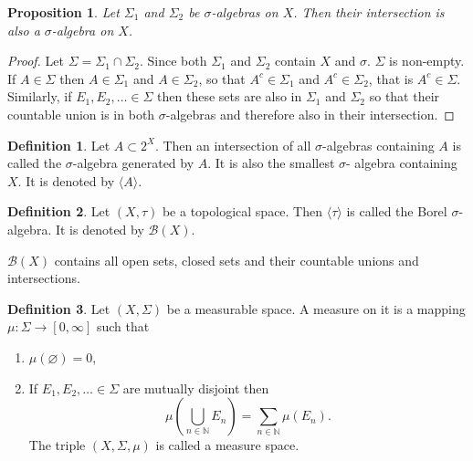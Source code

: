 \documentclass{article}
\theoremstyle{plain}
\numberwithin{thm}{section}
\theoremstyle{plain}
\newtheorem{prop}{Proposition}
\numberwithin{prop}{section}
\theoremstyle{definition}
\newtheorem{defn}{Definition}
\numberwithin{defn}{section}
\theoremstyle{remark}
\theoremstyle{plain}
\numberwithin{cor}{section}
\numberwithin{equation}{section}
\begin{document}
\begin{prop}\label{s1p3}
Let $\Sigma_1$ and $\Sigma_2$ be $\sigma$-algebras on $X$. Then their
intersection is also a $\sigma$-algebra on $X$.
\end{prop}
\begin{proof}
Let $\Sigma = \Sigma_1 \cap \Sigma_2$. Since both $\Sigma_1$ and 
$\Sigma_2$ contain $X$ and $\sigma$. $\Sigma$ is non-empty. If $A \in
\Sigma$ then $A \in \Sigma_1$ and $A \in \Sigma_2$, so that $A^c 
\in \Sigma_1$ and $A^c \in \Sigma_2$, that is $A^c \in \Sigma$. 
Similarly, if $E_1, E_2, \ldots \in \Sigma$ then these sets are also in 
$\Sigma_1$ and $\Sigma_2$ so that their countable union is in both
$\sigma$-algebras and therefore also in their intersection.
\end{proof}

\begin{defn}\label{s1d4}
Let $A \subset 2^X$. Then an intersection of all $\sigma$-algebras containing $A$
is called the $\sigma$-algebra generated by $A$. It is also the smallest $\sigma$-
algebra containing $X$. It is denoted by $\langle A \rangle$.
\end{defn}

\begin{defn}\label{s1d5}
Let $(X, \tau)$ be a topological space. Then $\langle\tau\rangle$ is called the
Borel $\sigma$-algebra. It is denoted by $\mathcal{B}(X)$.
\end{defn}

$\mathcal{B}(X)$ contains all open sets, closed sets and their countable unions
and intersections.

\begin{defn}\label{s1d6}
Let $(X, \Sigma)$ be a measurable space. A measure on it is a mapping
$\mu: \Sigma \rightarrow [0, \infty]$ such that
\begin{enumerate}
\item $\mu(\varnothing) = 0$,
\item If $E_1, E_2, \ldots \in \Sigma$ are mutually disjoint then
\[
\mu\left(\bigcup_{n \in \mathbb{N}}E_n\right) = \sum_{n \in \mathbb{N}}\mu(E_n).
\]
The triple $(X, \Sigma, \mu)$ is called a measure space.
\end{enumerate}
\end{defn}
\end{document}

